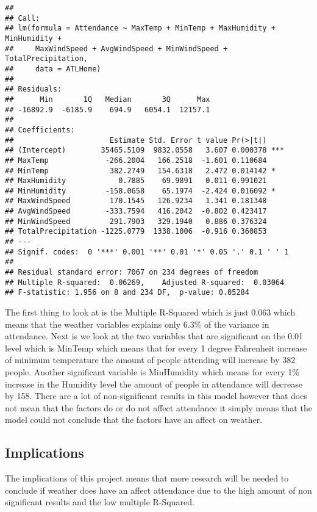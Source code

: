 \documentclass[
]{article}
\begin{document}
\begin{verbatim}
## 
## Call:
## lm(formula = Attendance ~ MaxTemp + MinTemp + MaxHumidity + MinHumidity + 
##     MaxWindSpeed + AvgWindSpeed + MinWindSpeed + TotalPrecipitation, 
##     data = ATLHome)
## 
## Residuals:
##      Min       1Q   Median       3Q      Max 
## -16892.9  -6185.9    694.9   6054.1  12157.1 
## 
## Coefficients:
##                      Estimate Std. Error t value Pr(>|t|)    
## (Intercept)        35465.5109  9832.0558   3.607 0.000378 ***
## MaxTemp             -266.2004   166.2518  -1.601 0.110684    
## MinTemp              382.2749   154.6318   2.472 0.014142 *  
## MaxHumidity            0.7885    69.9891   0.011 0.991021    
## MinHumidity         -158.0658    65.1974  -2.424 0.016092 *  
## MaxWindSpeed         170.1545   126.9234   1.341 0.181348    
## AvgWindSpeed        -333.7594   416.2042  -0.802 0.423417    
## MinWindSpeed         291.7903   329.1940   0.886 0.376324    
## TotalPrecipitation -1225.0779  1338.1006  -0.916 0.360853    
## ---
## Signif. codes:  0 '***' 0.001 '**' 0.01 '*' 0.05 '.' 0.1 ' ' 1
## 
## Residual standard error: 7067 on 234 degrees of freedom
## Multiple R-squared:  0.06269,    Adjusted R-squared:  0.03064 
## F-statistic: 1.956 on 8 and 234 DF,  p-value: 0.05284
\end{verbatim}

The first thing to look at is the Multiple R-Squared which is just 0.063
which means that the weather variables explains only 6.3\% of the
variance in attendance. Next is we look at the two variables that are
significant on the 0.01 level which is MinTemp which means that for
every 1 degree Fahrenheit increase of minimum temperature the amount of
people attending will increase by 382 people. Another significant
variable is MinHumidity which means for every 1\% increase in the
Humidity level the amount of people in attendance will decrease by 158.
There are a lot of non-significant results in this model however that
does not mean that the factors do or do not affect attendance it simply
means that the model could not conclude that the factors have an affect
on weather.

\hypertarget{implications}{%
\subsection{Implications}\label{implications}}

The implications of this project means that more research will be needed
to conclude if weather does have an affect attendance due to the high
amount of non significant results and the low multiple R-Squared.
\end{document}
